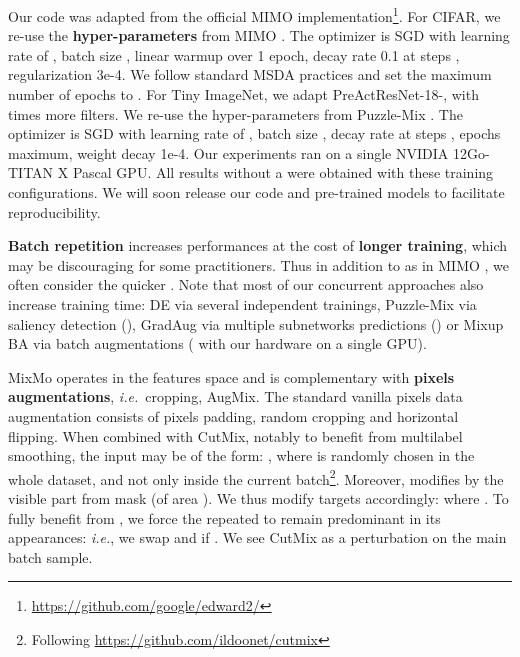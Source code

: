 \documentclass[10pt,twocolumn,letterpaper]{article}
\begin{document}
Our code was adapted from the official MIMO \cite{havasi2020raining}
implementation\footnote{\url{https://github.com/google/edward2/}}. For CIFAR,
we re-use the \textbf{hyper-parameters} from MIMO \cite{havasi2020raining}. The
optimizer is SGD with learning rate of , batch size , linear warmup over 1 epoch, decay
rate 0.1 at steps ,  regularization 3e-4. We follow
standard MSDA practices \cite{ashukha2020pitfalls,kim2020puzzle,yun2019cutmix} and
set the maximum number of epochs to . For Tiny ImageNet, we adapt
PreActResNet-18-, with  times more filters. We re-use the
hyper-parameters from Puzzle-Mix \cite{kim2020puzzle}. The optimizer is SGD with
learning rate of , batch size , decay rate  at steps
,  epochs maximum, weight decay 1e-4.
Our experiments ran on a single NVIDIA 12Go-TITAN X Pascal GPU.
All results without a  were obtained with these training configurations.
We will soon release our code and pre-trained models to facilitate reproducibility.

\textbf{Batch repetition} increases performances at the cost of \textbf{longer training}, which may be discouraging for some practitioners. Thus in addition to  as in MIMO \cite{havasi2020raining}, we often consider the quicker . Note that most of our concurrent approaches also increase training time: DE
\cite{lakshminarayanan2016simple} via several independent trainings, Puzzle-Mix
\cite{kim2020puzzle} via saliency detection (), GradAug
\cite{yang2020radaug} via multiple subnetworks predictions () or
Mixup BA \cite{Hoffer_2020_CVPR} via  batch augmentations (
with our hardware on a single GPU).


MixMo operates in the features space and is complementary with \textbf{pixels
augmentations}, \textit{i.e.}\ cropping, AugMix. The standard vanilla pixels
data augmentation \cite{he51deep} consists of  pixels padding, random
cropping and horizontal flipping. When combined with CutMix, notably to benefit
from multilabel smoothing, the input may be of the form: , where  is randomly chosen in the whole dataset, and not
only inside the current batch\footnote{Following \url{https://github.com/ildoonet/cutmix}}. Moreover,
 modifies by  the
visible part from mask  (of area ). We thus modify
targets accordingly:  where
. To fully benefit from , we force the repeated
 to remain predominant in its  appearances: \textit{i.e.}, we swap
 and  if . We see CutMix as a perturbation on the
main batch sample.
\end{document}
